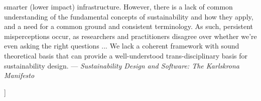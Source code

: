 \documentclass[11pt,twocolumn]{article}
\begin{document}
\begin{@twocolumnfalse}
\begin{lrbox}{\qboxi}
\begin{frquote}
smarter (lower impact) infrastructure. However, there is a lack
of  common  understanding  of  the  fundamental  concepts  of
sustainability and how they apply, and a need for a common
ground and consistent terminology. As such, persistent 
misperceptions occur, as researchers and practitioners disagree over
whether we're even asking the right questions ...
We  lack  a  coherent  framework  with  sound  theoretical  basis
that can provide a well-understood trans-disciplinary basis for
sustainability design. --- 
\textit{{\sadded}Sustainability Design and Software: {\eadded} 
The Karlskrona Manifesto} {\cite[page 5]{Karlskrona}}
\end{frquote}
\end{lrbox}	
\vspace{1em}
\begin{flushright}
\usebox{\qboxi}
\end{flushright}
\vspace{1em}
\decoline{}
\vspace{4em}
\end{@twocolumnfalse}]











\end{document}
